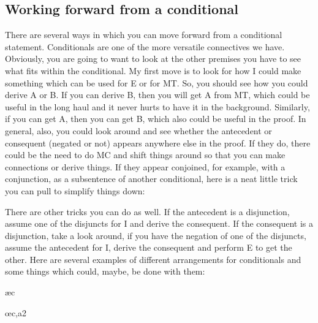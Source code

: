 \subsection{Working forward from a conditional}

There are several ways in which you can move forward from a conditional statement. Conditionals are one of the more versatile connectives we have. Obviously, you are going to want to look at the other premises you have to see what fits within the conditional. My first move is to look for how I could make something which can be used for \eif E or for MT. So, you should see how you could derive A or \enot B. If you can derive \enot B, then you will get \enot A from MT, which could be useful in the long haul and it never hurts to have it in the background. Similarly, if you can get A, then you can get B, which also could be useful in the proof. In general, also, you could look around and see whether the antecedent or consequent (negated or not) appears anywhere else in the proof. If they do, there could be the need to do MC and shift things around so that you can make connections or derive things. If they appear conjoined, for example, with a conjunction, as a subsentence of another conditional, here is a neat little trick you can pull to simplify things down:
\begin{fitchproof}
\open
{}
\close
{}
\end{fitchproof}

There are other tricks you can do as well. If the antecedent is a disjunction, assume one of the disjuncts for \eif I and derive the consequent. If the consequent is a disjunction, take a look around, if you have the negation of one of the disjuncts, assume the antecedent for \eif I, derive the consequent and perform \eor E to get the other. Here are several examples of different arrangements for conditionals and some things which could, maybe, be done with them:
\begin{fitchproof}
\open
{}
\ae{c}
\close
{}
\end{fitchproof}

\begin{fitchproof}
\open
{}
\oe{c,a2}
\close
{}
\end{fitchproof}
